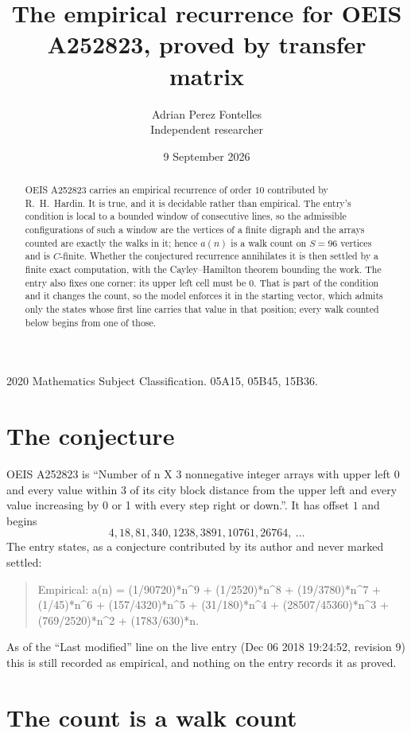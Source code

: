 \documentclass[11pt,a4paper]{article}
\title{The empirical recurrence for OEIS A252823, proved by transfer matrix}
\author{Adrian Perez Fontelles\\ \small Independent researcher}
\date{9 September 2026}
\theoremstyle{plain}
\theoremstyle{definition}
\begin{document}
\maketitle

\begin{abstract}
OEIS A252823 carries an empirical recurrence of order $10$ contributed by R.~H.~Hardin. It is
true, and it is decidable rather than empirical. The entry's condition is local to a bounded window of consecutive lines, so
the admissible configurations of such a window are the vertices of a finite digraph and the
arrays counted are exactly the walks in it; hence $a(n)$ is a walk count on $S=96$ vertices
and is $C$-finite. Whether the conjectured recurrence annihilates it is then settled by a
finite exact computation, with the Cayley--Hamilton theorem bounding the work.
 The entry also fixes one corner: its upper left cell must be $0$. That is part of the condition and it changes the count, so the model enforces it in the starting vector, which admits only the states whose first line carries that value in that position; every walk counted below begins from one of those.\end{abstract}

\noindent\small 2020 Mathematics Subject Classification. 05A15, 05B45, 15B36.\normalsize

\section{The conjecture}

OEIS A252823 is ``Number of n X 3 nonnegative integer arrays with upper left 0 and every value within 3 of its city block distance from the upper left and every value increasing by 0 or 1 with every step right or down.''. It has offset $1$ and begins
\[
4, 18, 81, 340, 1238, 3891, 10761, 26764,\ \dots
\]
The entry states, as a conjecture contributed by its author and never marked settled:
\begin{quote}
Empirical: a(n) = (1/90720)*n\^{}9 + (1/2520)*n\^{}8 + (19/3780)*n\^{}7 + (1/45)*n\^{}6 + (157/4320)*n\^{}5 + (31/180)*n\^{}4 + (28507/45360)*n\^{}3 + (769/2520)*n\^{}2 + (1783/630)*n.
\end{quote}
As of the ``Last modified'' line on the live entry (Dec 06 2018 19:24:52, revision 9) this is still
recorded as empirical, and nothing on the entry records it as proved.

\section{The count is a walk count}
\end{document}
